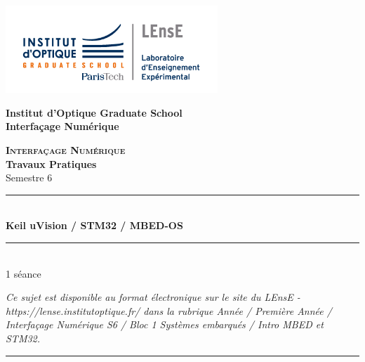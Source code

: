 \documentclass[a4paper,11pt,titlepage]{article} %
\begin{document}
\begin{titlepage}

\begin{center}
	\begin{minipage}{2.5cm}
	\begin{center}
		\includegraphics[width=8cm]{images/Logo-LEnsE.png}
	\end{center}
\end{minipage}\hfill
\begin{minipage}{10cm}
	\begin{center}
	\textbf{Institut d'Optique Graduate School }\\[0.1cm]
    \textbf{Interfaçage Numérique}


	\end{center}
\end{minipage}\hfill


\vspace{4cm}


{\huge \bfseries \textsc{Interfaçage Numérique}} \\[0.5cm]
{\large \bfseries Travaux Pratiques} \\[0.2cm]
Semestre 6

\vspace{2cm}
\rule{\linewidth}{0.3mm} \\[0.4cm]
{ \huge \bfseries\color{violet_iogs} Keil uVision / STM32 / MBED-OS\\[0.4cm] }
\rule{\linewidth}{0.3mm} \\[1cm]

1 séance

\bigskip

\begin{center}
\end{center}

\vfill

\textit{Ce sujet est disponible au format électronique sur le site du LEnsE - https://lense.institutoptique.fr/ dans la rubrique Année / Première Année / Interfaçage Numérique S6 / Bloc 1 Systèmes embarqués / Intro MBED et STM32.}

\rule{\linewidth}{0.3mm} \\[1cm]


\end{center}
\end{titlepage}
\end{document}
